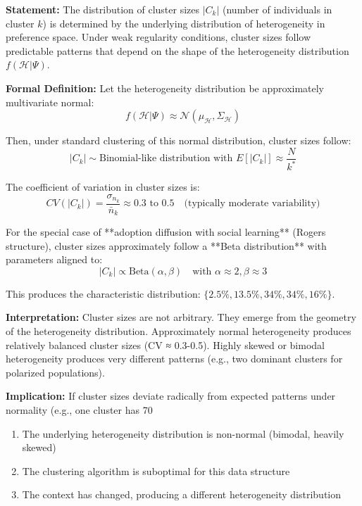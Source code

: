 \begin{tcolorbox}[colback=gray!5!white, colframe=gray!75!black,
    title=Axiom SEG-EMERGE-7: Natural Distribution of Cluster Sizes Under Heterogeneity]

\textbf{Statement:}
The distribution of cluster sizes $|C_k|$ (number of individuals in cluster $k$) is
determined by the underlying distribution of heterogeneity in preference space.
Under weak regularity conditions, cluster sizes follow predictable patterns that
depend on the shape of the heterogeneity distribution $f(\mathcal{H} | \Psi)$.

\textbf{Formal Definition:}
Let the heterogeneity distribution be approximately multivariate normal:
\begin{equation}
f(\mathcal{H} | \Psi) \approx \mathcal{N}(\mu_{\mathcal{H}}, \Sigma_{\mathcal{H}})
\end{equation}

Then, under standard clustering of this normal distribution, cluster sizes follow:
\begin{equation}
|C_k| \sim \text{Binomial-like distribution with } E[|C_k|] \approx \frac{N}{k^*}
\end{equation}

The coefficient of variation in cluster sizes is:
\begin{equation}
CV(|C_k|) = \frac{\sigma_{n_k}}{\bar{n}_k} \approx 0.3 \text{ to } 0.5
\quad \text{(typically moderate variability)}
\end{equation}

For the special case of **adoption diffusion with social learning** (Rogers structure),
cluster sizes approximately follow a **Beta distribution** with parameters aligned to:
\begin{equation}
|C_k| \propto \text{Beta}(\alpha, \beta) \quad \text{with } \alpha \approx 2, \beta \approx 3
\end{equation}

This produces the characteristic distribution: $\{2.5\%, 13.5\%, 34\%, 34\%, 16\%\}$.

\textbf{Interpretation:}
Cluster sizes are not arbitrary. They emerge from the geometry of the heterogeneity
distribution. Approximately normal heterogeneity produces relatively balanced cluster
sizes (CV ≈ 0.3-0.5). Highly skewed or bimodal heterogeneity produces very different
patterns (e.g., two dominant clusters for polarized populations).

\textbf{Implication:}
If cluster sizes deviate radically from expected patterns under normality (e.g., one
cluster has 70%
\begin{enumerate}[nosep]
\item The underlying heterogeneity distribution is non-normal (bimodal, heavily skewed)
\item The clustering algorithm is suboptimal for this data structure
\item The context has changed, producing a different heterogeneity distribution
\end{enumerate}


\end{tcolorbox}
